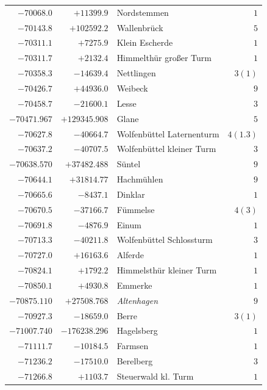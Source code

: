 \begin{center}
\begin{tabular}{r|r|p{170pt}|r}
\(-70068.0\)&\(+11399.9\)&Nordstemmen&\(1\)\\
\(-70143.8\)&\(+102592.2\)&Wallenbrück&\(5\)\\
\(-70311.1\)&\(+7275.9\)&Klein Escherde&\(1\)\\
\(-70311.7\)&\(+2132.4\)&Himmelthür großer Turm&\(1\)\\
\(-70358.3\)&\(-14639.4\)&Nettlingen&\(3 (1)\)\\
\(-70426.7\)&\(+44936.0\)&Weibeck&\(9\)\\
\(-70458.7\)&\(-21600.1\)&Lesse&\(3\)\\
\(-70471.967\)&\(+129345.908\)&Glane&\(5\)\\
\(-70627.8\)&\(-40664.7\)&Wolfenbüttel Laternenturm&\(4(1.3)\)\\
\(-70637.2\)&\(-40707.5\)&Wolfenbüttel kleiner Turm&\(3\)\\
\(-70638.570\)&\(+37482.488\)&Süntel&\(9\)\\
\(-70644.1\)&\(+31814.77\)&Hachmühlen&\(9\)\\
\(-70665.6\)&\(-8437.1\)&Dinklar&\(1\)\\
\(-70670.5\)&\(-37166.7\)&Fümmelse&\(4 (3)\)\\
\(-70691.8\)&\(-4876.9\)&Einum&\(1\)\\
\(-70713.3\)&\(-40211.8\)&Wolfenbüttel Schlossturm&\(3\)\\
\(-70727.0\)&\(+16163.6\)&Alferde&\(1\)\\
\(-70824.1\)&\(+1792.2\)&Himmelsthür kleiner Turm&\(1\)\\
\(-70850.1\)&\(+4930.8\)&Emmerke&\(1\)\\
\(-70875.110\)&\(+27508.768\)&\textit{Altenhagen}&\(9\)\\
\(-70927.3\)&\(-18659.0\)&Berre&\(3 (1)\)\\
\(-71007.740\)&\(-176238.296\)&Hagelsberg&\(1\)\\
\(-71111.7\)&\(-10184.5\)&Farmsen&\(1\)\\
\(-71236.2\)&\(-17510.0\)&Berelberg&\(3\)\\
\(-71266.8\)&\(+1103.7\)&Steuerwald kl. Turm&\(1\)\\
\hline\end{tabular}\endgroup\end{center}
\clearpage
